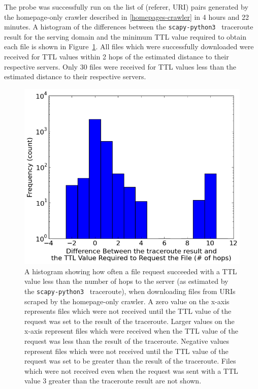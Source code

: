 The probe was successfully run on the list of (referer, URI) pairs generated by the homepage-only crawler described in \autoref{homepages-crawler} in 4 hours and 22 minutes.
A histogram of the differences between the \texttt{scapy-python3}~\cite{Dobelis2015} traceroute result for the serving domain and the minimum TTL value required to obtain each file is shown in Figure~\ref{fig_histhomepages}.
All files which were successfully downloaded were received for TTL values within 2 hops of the estimated distance to their respective servers.
Only 30 files were received for TTL values less than the estimated distance to their respective servers.
\begin{figure}
	\includegraphics[width=\columnwidth]{figures/histhomepages}
	\caption{
		A histogram showing how often a file request succeeded with a TTL value less than the number of hops to the server (as estimated by the \texttt{scapy-python3}~\cite{Dobelis2015} traceroute), when downloading files from URIs scraped by the homepage-only crawler.
		A zero value on the x-axis represents files which were not received until the TTL value of the request was set to the result of the traceroute.
		Larger values on the x-axis represent files which were received when the TTL value of the request was less than the result of the traceroute.
		Negative values represent files which were not received until the TTL value of the request was set to be greater than the result of the traceroute.
		Files which were not received even when the request was sent with a TTL value 3 greater than the traceroute result are not shown.
	}
	\label{fig_histhomepages}
\end{figure}

